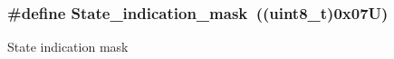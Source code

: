 \subsubsection[{\texorpdfstring{State\+\_\+indication\+\_\+mask}{State_indication_mask}}]{\setlength{\rightskip}{0pt plus 5cm}\#define State\+\_\+indication\+\_\+mask~((uint8\+\_\+t)0x07\+U)}\hypertarget{group___u_a_r_t___control___from_gac1dc46273764bf13be2f30fcc60806a4}{}\label{group___u_a_r_t___control___from_gac1dc46273764bf13be2f30fcc60806a4}
State indication mask 